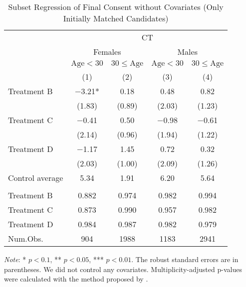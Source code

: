 \documentclass[12pt, a4paper]{article}
\begin{document}
\begin{table}[H]

\caption{\label{tab:lm-consent-subset1-init}Subset Regression of Final Consent without Covariates (Only Initially Matched Candidates)}
\centering
\fontsize{8}{10}\selectfont
\begin{threeparttable}
\begin{tabular}[t]{lcccc}
\toprule
\multicolumn{1}{c}{ } & \multicolumn{4}{c}{CT} \\
\cmidrule(l{3pt}r{3pt}){2-5}
\multicolumn{1}{c}{ } & \multicolumn{2}{c}{Females} & \multicolumn{2}{c}{Males} \\
\cmidrule(l{3pt}r{3pt}){2-3} \cmidrule(l{3pt}r{3pt}){4-5}
\multicolumn{1}{c}{ } & \multicolumn{1}{c}{$\text{Age} < 30$} & \multicolumn{1}{c}{$30 \le \text{Age}$} & \multicolumn{1}{c}{$\text{Age} < 30$} & \multicolumn{1}{c}{$30 \le \text{Age}$} \\
\cmidrule(l{3pt}r{3pt}){2-2} \cmidrule(l{3pt}r{3pt}){3-3} \cmidrule(l{3pt}r{3pt}){4-4} \cmidrule(l{3pt}r{3pt}){5-5}
  & (1) & (2) & (3) & (4)\\
\midrule
Treatment B & \num{-3.21}* & \num{0.18} & \num{0.48} & \num{0.82}\\
 & (\num{1.83}) & (\num{0.89}) & (\num{2.03}) & (\num{1.23})\\
Treatment C & \num{-0.41} & \num{0.50} & \num{-0.98} & \num{-0.61}\\
 & (\num{2.14}) & (\num{0.96}) & (\num{1.94}) & (\num{1.22})\\
Treatment D & \num{-1.17} & \num{1.45} & \num{0.72} & \num{0.32}\\
 & (\num{2.03}) & (\num{1.00}) & (\num{2.09}) & (\num{1.26})\\
\midrule
Control average & 5.34 & 1.91 & 6.20 & 5.64\\
\addlinespace[0.3em]
\multicolumn{5}{l}{\textit{Multiplicity-adjusted p-values}}\\
\hspace{1em}Treatment B & 0.882 & 0.974 & 0.982 & 0.994\\
\hspace{1em}Treatment C & 0.873 & 0.990 & 0.957 & 0.982\\
\hspace{1em}Treatment D & 0.984 & 0.987 & 0.982 & 0.979\\
Num.Obs. & \num{904} & \num{1988} & \num{1183} & \num{2941}\\
\bottomrule
\end{tabular}
\begin{tablenotes}
\item \emph{Note}: * $p < 0.1$, ** $p < 0.05$, *** $p < 0.01$. The robust standard errors are in parentheses. We did not control any covariates. Multiplicity-adjusted p-values were calculated with the method proposed by \cite{List2019}.
\end{tablenotes}
\end{threeparttable}
\end{table}
\end{document}
